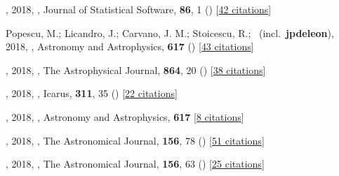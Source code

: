 \item[{\color{numcolor}\scriptsize86}] , 2018, , Journal of Statistical Software, \textbf{86}, 1 () [\href{https://scholar.google.com/scholar?cites=789224875040810871}{42 citations}]

\item[{\color{numcolor}\scriptsize85}] Popescu, M.; Licandro, J.; Carvano, J. M.; Stoicescu, R.; \etal\ (incl.\ \textbf{jpdeleon}), 2018, , Astronomy and Astrophysics, \textbf{617} () [\href{https://ui.adsabs.harvard.edu/abs/2018A&A...617A..12P}{43 citations}]

\item[{\color{numcolor}\scriptsize84}] , 2018, , The Astrophysical Journal, \textbf{864}, 20 () [\href{https://ui.adsabs.harvard.edu/abs/2018ApJ...864...20T}{38 citations}]

\item[{\color{numcolor}\scriptsize83}] , 2018, , Icarus, \textbf{311}, 35 () [\href{https://ui.adsabs.harvard.edu/abs/2018Icar..311...35D}{22 citations}]

\item[{\color{numcolor}\scriptsize82}] , 2018, , Astronomy and Astrophysics, \textbf{617} [\href{https://ui.adsabs.harvard.edu/abs/2018A&A...617A..72M}{8 citations}]

\item[{\color{numcolor}\scriptsize81}] , 2018, , The Astronomical Journal, \textbf{156}, 78 () [\href{https://ui.adsabs.harvard.edu/abs/2018AJ....156...78L}{51 citations}]

\item[{\color{numcolor}\scriptsize80}] , 2018, , The Astronomical Journal, \textbf{156}, 63 () [\href{https://ui.adsabs.harvard.edu/abs/2018AJ....156...63U}{25 citations}]

